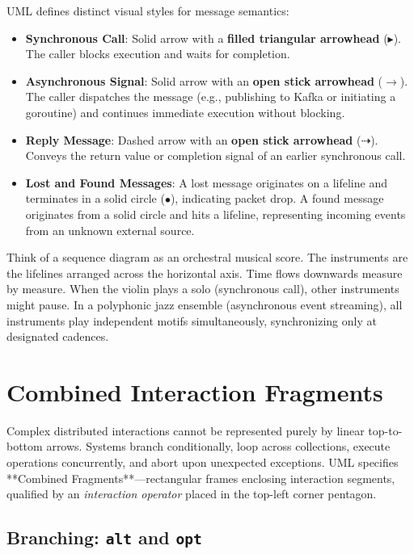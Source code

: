 UML defines distinct visual styles for message semantics:
\begin{itemize}[leftmargin=18pt]
  \item \textbf{Synchronous Call}: Solid arrow with a \textbf{filled triangular arrowhead} ($\blacktriangleright$). The caller blocks execution and waits for completion.
  \item \textbf{Asynchronous Signal}: Solid arrow with an \textbf{open stick arrowhead} ($\rightarrow$). The caller dispatches the message (e.g., publishing to Kafka or initiating a goroutine) and continues immediate execution without blocking.
  \item \textbf{Reply Message}: Dashed arrow with an \textbf{open stick arrowhead} ($\dashrightarrow$). Conveys the return value or completion signal of an earlier synchronous call.
  \item \textbf{Lost and Found Messages}: A lost message originates on a lifeline and terminates in a solid circle ($\bullet$), indicating packet drop. A found message originates from a solid circle and hits a lifeline, representing incoming events from an unknown external source.
\end{itemize}

\begin{intuitionbox}
Think of a sequence diagram as an orchestral musical score. The instruments are the lifelines arranged across the horizontal axis. Time flows downwards measure by measure. When the violin plays a solo (synchronous call), other instruments might pause. In a polyphonic jazz ensemble (asynchronous event streaming), all instruments play independent motifs simultaneously, synchronizing only at designated cadences.
\end{intuitionbox}

\section{Combined Interaction Fragments}

Complex distributed interactions cannot be represented purely by linear top-to-bottom arrows. Systems branch conditionally, loop across collections, execute operations concurrently, and abort upon unexpected exceptions. UML specifies **Combined Fragments**—rectangular frames enclosing interaction segments, qualified by an \textit{interaction operator} placed in the top-left corner pentagon.

\subsection{Branching: \texttt{alt} and \texttt{opt}}

